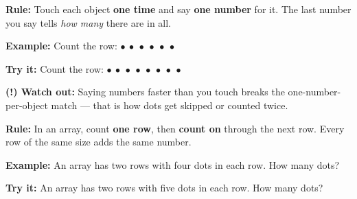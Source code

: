 \documentclass[12pt]{article}
\begin{document}


\begin{formulabox}
\textbf{Rule:} Touch each object \textbf{one time} and say \textbf{one number}
for it. The last number you say tells \emph{how many} there are in all.
\end{formulabox}

\begin{examplebox}
\textbf{Example:} \quad Count the row:
$\bullet\ \bullet\ \bullet\ \bullet\ \bullet\ \bullet$
\end{examplebox}

\begin{tryitbox}
\textbf{Try it:} \quad Count the row:
$\bullet\ \bullet\ \bullet\ \bullet\ \bullet\ \bullet\ \bullet\ \bullet$\\[2pt]
\end{tryitbox}

\begin{watchoutbox}
\textbf{(!) Watch out:} Saying numbers faster than you touch breaks the
one-number-per-object match --- that is how dots get skipped or counted twice.
\end{watchoutbox}


\begin{formulabox}
\textbf{Rule:} In an array, count \textbf{one row}, then \textbf{count on}
through the next row. Every row of the same size adds the same number.
\end{formulabox}

\begin{examplebox}
\textbf{Example:} \quad An array has two rows with four dots in each row. How
many dots?
\end{examplebox}

\begin{tryitbox}
\textbf{Try it:} \quad An array has two rows with five dots in each row. How
many dots?\\[2pt]
\end{tryitbox}
\end{document}

